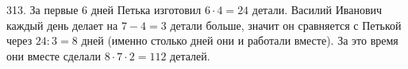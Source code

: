 313. За первые 6 дней Петька изготовил $6\cdot4=24$ детали. Василий Иванович каждый день делает на $7-4=3$ детали больше, значит он сравняется с Петькой через $24:3=8$ дней (именно столько дней они и работали вместе). За это время они вместе сделали $8\cdot7\cdot2=112$ деталей.\\
